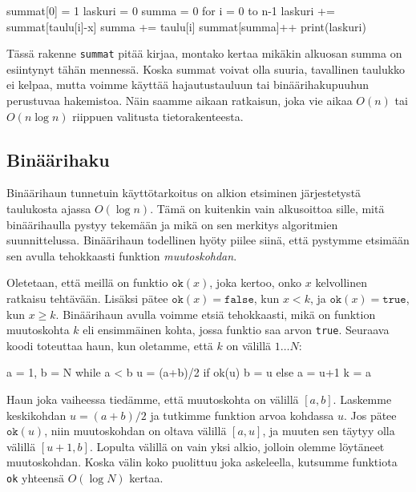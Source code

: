 \begin{code}
summat[0] = 1
laskuri = 0
summa = 0
for i = 0 to n-1
    laskuri += summat[taulu[i]-x]
    summa += taulu[i]
    summat[summa]++
print(laskuri)
\end{code}

Tässä rakenne \texttt{summat} pitää kirjaa,
montako kertaa mikäkin alkuosan summa on esiintynyt tähän mennessä.
Koska summat voivat olla suuria, tavallinen taulukko ei kelpaa,
mutta voimme käyttää hajautustauluun tai binäärihakupuuhun
perustuvaa hakemistoa.
Näin saamme aikaan ratkaisun, joka vie aikaa $O(n)$ tai $O(n \log n)$
riippuen valitusta tietorakenteesta.

\subsection{Binäärihaku}

Binäärihaun tunnetuin käyttötarkoitus on alkion etsiminen
järjestetystä taulukosta ajassa $O(\log n)$.
Tämä on kuitenkin vain alkusoittoa sille,
mitä binää\-rihaulla pystyy tekemään ja mikä on sen
merkitys algoritmien suunnittelussa.
Binääri\-haun todellinen hyöty piilee siinä,
että pystymme etsimään sen avulla tehokkaasti funktion \emph{muutoskohdan}.

Oletetaan, että meillä on funktio $\texttt{ok}(x)$,
joka kertoo, onko $x$ kelvollinen ratkaisu tehtävään.
Lisäksi pätee $\texttt{ok}(x)=\texttt{false}$, kun $x<k$,
ja $\texttt{ok}(x)=\texttt{true}$, kun $x \ge k$.
Binäärihaun avulla voimme etsiä tehokkaasti,
mikä on funktion muutoskohta $k$
eli ensimmäinen kohta, jossa funktio saa arvon \texttt{true}.
Seuraava koodi toteuttaa haun, kun oletamme, että $k$ on välillä $1 \dots N$:

\begin{code}
a = 1, b = N
while a < b
    u = (a+b)/2
    if ok(u)
        b = u
    else
        a = u+1
k = a
\end{code}

Haun joka vaiheessa tiedämme, että muutoskohta on välillä $[a,b]$.
Laskemme keskikohdan $u=(a+b)/2$ ja tutkimme funktion arvoa kohdassa $u$.
Jos pätee $\texttt{ok}(u)$, niin muutoskohdan on oltava välillä $[a,u]$,
ja muuten sen täytyy olla välillä $[u+1,b]$.
Lopulta välillä on vain yksi alkio, jolloin olemme löytäneet muutoskohdan.
Koska välin koko puolittuu joka askeleella,
kutsumme funktiota \texttt{ok} yhteensä $O(\log N)$ kertaa.


